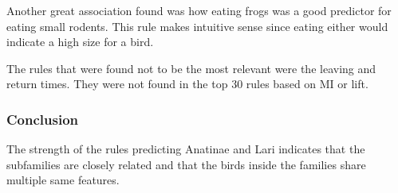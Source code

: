 Another great association found was how eating frogs was a good predictor for eating small rodents. This rule makes intuitive sense since eating either would indicate a high size for a bird.

The rules that were found not to be the most relevant were the leaving and return times. They were not found in the top 30 rules based on MI or lift.

\subsubsection{Conclusion}

The strength of the rules predicting Anatinae and Lari indicates that the subfamilies are closely related and that the birds inside the families share multiple same features.


